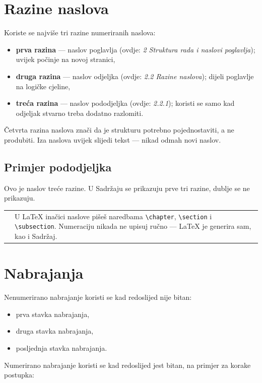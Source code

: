 \documentclass[12pt,a4paper,oneside]{report}
\makeatletter
\newcommand{\napomena}[1]{%
  \par\vspace{6pt}
  \noindent\begin{tabular}{@{}p{3pt}@{\hspace{10pt}}p{\dimexpr\textwidth-13pt\relax}@{}}
  \cellcolor{fakplava} & \small #1
  \end{tabular}\par\vspace{6pt}}
\makeatother
\begin{document}
\section{Razine naslova}

Koriste se najviše tri razine numeriranih naslova:

\begin{itemize}[leftmargin=*,itemsep=2pt,topsep=4pt]
  \item \textbf{prva razina} — naslov poglavlja (ovdje: \emph{2 Struktura rada i naslovi poglavlja}); uvijek počinje na novoj stranici,
  \item \textbf{druga razina} — naslov odjeljka (ovdje: \emph{2.2 Razine naslova}); dijeli poglavlje na logičke cjeline,
  \item \textbf{treća razina} — naslov pododjeljka (ovdje: \emph{2.2.1}); koristi se samo kad odjeljak stvarno treba dodatno razlomiti.
\end{itemize}

Četvrta razina naslova znači da je strukturu potrebno pojednostaviti, a ne produbiti. Iza naslova uvijek slijedi tekst — nikad odmah novi naslov.

\subsection{Primjer pododjeljka}

Ovo je naslov treće razine. U Sadržaju se prikazuju prve tri razine, dublje se ne prikazuju.

\napomena{U LaTeX inačici naslove pišeš naredbama \texttt{\textbackslash chapter}, \texttt{\textbackslash section} i \texttt{\textbackslash subsection}. Numeraciju nikada ne upisuj ručno — LaTeX je generira sam, kao i Sadržaj.}

\section{Nabrajanja}

Nenumerirano nabrajanje koristi se kad redoslijed nije bitan:

\begin{itemize}[leftmargin=*,itemsep=2pt,topsep=4pt]
  \item prva stavka nabrajanja,
  \item druga stavka nabrajanja,
  \item posljednja stavka nabrajanja.
\end{itemize}

Numerirano nabrajanje koristi se kad redoslijed jest bitan, na primjer za korake postupka:
\end{document}
